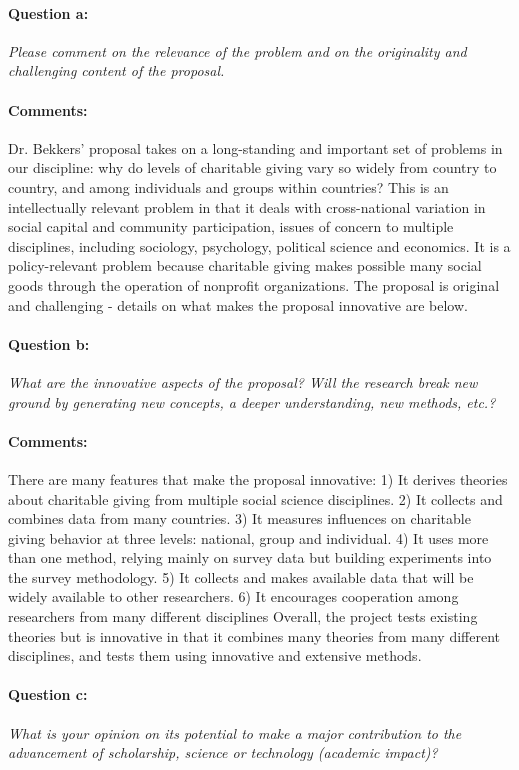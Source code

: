 \documentclass[twocolumn, serif, rga, numeric]{jote-article}
\begin{document}
\paragraph{Question a:}
\textit{Please comment on the relevance of the problem and on the originality and challenging content of the proposal.}
\paragraph{Comments:}
Dr. Bekkers' proposal takes on a long-standing and important set of problems in our discipline: why do levels of charitable giving vary so widely from country to country, and among individuals and groups within countries? This is an intellectually relevant problem in that it deals with cross-national variation in social capital and community participation, issues of concern to multiple disciplines, including sociology, psychology, political science and economics. It is a policy-relevant problem because charitable giving makes possible many social goods through the operation of nonprofit organizations. The proposal is original and challenging - details on what makes the proposal innovative are below.
\paragraph{Question b:}
\textit{What are the innovative aspects of the proposal? Will the research break new ground by generating new concepts, a deeper understanding, new methods, etc.?}
\paragraph{Comments:}
There are many features that make the proposal innovative:
1) It derives theories about charitable giving from multiple social science disciplines.
2) It collects and combines data from many countries.
3) It measures influences on charitable giving behavior at three levels: national, group and individual.
4) It uses more than one method, relying mainly on survey data but building experiments into the survey methodology.
5) It collects and makes available data that will be widely available to other researchers.
6) It encourages cooperation among researchers from many different disciplines
Overall, the project tests existing theories but is innovative in that it combines many theories from many different disciplines, and tests them using innovative and extensive methods.
\paragraph{Question c:}
\textit{What is your opinion on its potential to make a major contribution to the advancement of scholarship, science or technology (academic impact)?}
\end{document}
